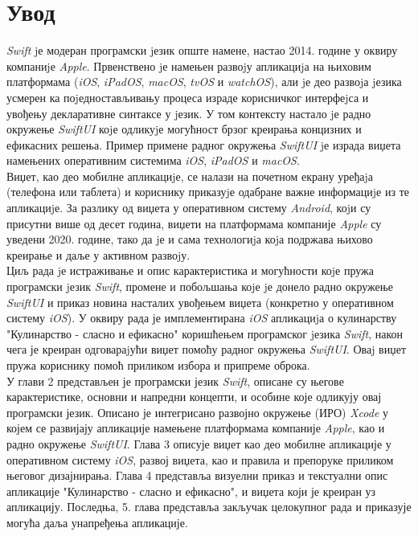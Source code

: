 \documentclass[12pt,oneside]{memoir}
\begin{document}
\frontmatter
\naslovna
\komisija
\apstrakt
\tableofcontents*

\mainmatter

\chapter{Увод}

\indent \textit{Swift} jе модеран програмски jезик опште намене, настао 2014. године у оквиру компаниjе \textit{Apple}. Првенствено jе намењен развоjу апликациjа на њиховим платформама (\textit{iOS}, \textit{iPadOS}, \textit{macOS}, \textit{tvOS} и \textit{watchOS}), али jе део развоjа jезика усмерен ка поjедностављивању процеса израде корисничког интерфеjса и увођењу декларативне синтаксе у jезик. У том контексту настало jе радно окружење \textit{SwiftUI} коjе одликуjе могућност брзог креирања концизних и ефикасних решења. Пример примене радног окружења \textit{SwiftUI} jе израда виџета намењених оперативним системима \textit{iOS}, \textit{iPadOS} и \textit{macOS}. 
\\
\indent Виџет, као део мобилне апликациjе, се налази на почетном екрану уређаjа (телефона или таблета) и кориснику приказуjе одабране важне информациjе из те апликациjе. За разлику од виџета у оперативном систему \textit{Android}, коjи су присутни више од десет година, виџети на платформама компаније \textit{Apple} су уведени 2020. године, тако да jе и сама технологиjа коjа подржава њихово креирање и даље у активном развоjу.
\\
\indent Циљ рада jе истраживање и опис карактеристика и могућности коjе пружа програмски jезик \textit{Swift}, промене и побољшања коjе jе донело радно окружење \textit{SwiftUI} и приказ новина насталих увођењем виџета (конкретно у оперативном систему \textit{iOS}). У оквиру рада је имплементирана \textit{iOS} апликациjа о кулинарству "Кулинарство - сласно и ефикасно" коришћењем програмског jезика \textit{Swift}, након чега је креиран одговараjући виџет помоћу радног окружења \textit{SwiftUI}. Оваj виџет пружа кориснику помоћ приликом избора и припреме оброка.
\\
\indent У глави 2 представљен је програмски језик \textit{Swift}, описане су његове карактеристике, основни и напредни концепти, и особине које одликују овај програмски језик. Описано је интегрисано развојно окружење (ИРО) \textit{Xcode} у којем се развијају апликације намењене платформама компаније \textit{Apple}, као и радно окружење \textit{SwiftUI}. Глава 3 описује виџет као део мобилне апликације у оперативном систему \textit{iOS}, развој виџета, као и правила и препоруке приликом његовог дизајнирања. Глава 4 представља визуелни приказ и текстуални опис апликације "Кулинарство - сласно и ефикасно", и виџета који је креиран уз апликацију. Последња, 5. глава представља закључак целокупног рада и приказује могућа даља унапређења апликације.
\end{document}
